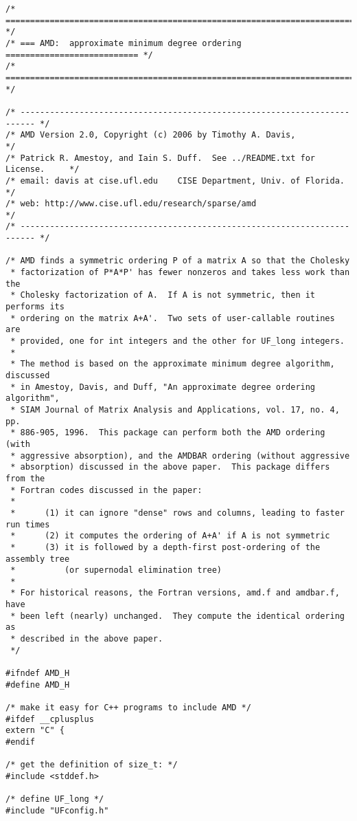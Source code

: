 \documentclass[11pt]{article}
\begin{document}
{\footnotesize
\begin{verbatim}
/* ========================================================================= */
/* === AMD:  approximate minimum degree ordering =========================== */
/* ========================================================================= */

/* ------------------------------------------------------------------------- */
/* AMD Version 2.0, Copyright (c) 2006 by Timothy A. Davis,                  */
/* Patrick R. Amestoy, and Iain S. Duff.  See ../README.txt for License.     */
/* email: davis at cise.ufl.edu    CISE Department, Univ. of Florida.        */
/* web: http://www.cise.ufl.edu/research/sparse/amd                          */
/* ------------------------------------------------------------------------- */

/* AMD finds a symmetric ordering P of a matrix A so that the Cholesky
 * factorization of P*A*P' has fewer nonzeros and takes less work than the
 * Cholesky factorization of A.  If A is not symmetric, then it performs its
 * ordering on the matrix A+A'.  Two sets of user-callable routines are
 * provided, one for int integers and the other for UF_long integers.
 *
 * The method is based on the approximate minimum degree algorithm, discussed
 * in Amestoy, Davis, and Duff, "An approximate degree ordering algorithm",
 * SIAM Journal of Matrix Analysis and Applications, vol. 17, no. 4, pp.
 * 886-905, 1996.  This package can perform both the AMD ordering (with
 * aggressive absorption), and the AMDBAR ordering (without aggressive
 * absorption) discussed in the above paper.  This package differs from the
 * Fortran codes discussed in the paper:
 *
 *      (1) it can ignore "dense" rows and columns, leading to faster run times
 *      (2) it computes the ordering of A+A' if A is not symmetric
 *      (3) it is followed by a depth-first post-ordering of the assembly tree
 *          (or supernodal elimination tree)
 *
 * For historical reasons, the Fortran versions, amd.f and amdbar.f, have
 * been left (nearly) unchanged.  They compute the identical ordering as
 * described in the above paper.
 */

#ifndef AMD_H
#define AMD_H

/* make it easy for C++ programs to include AMD */
#ifdef __cplusplus
extern "C" {
#endif

/* get the definition of size_t: */
#include <stddef.h>

/* define UF_long */
#include "UFconfig.h"


\end{verbatim}}
\end{document}
